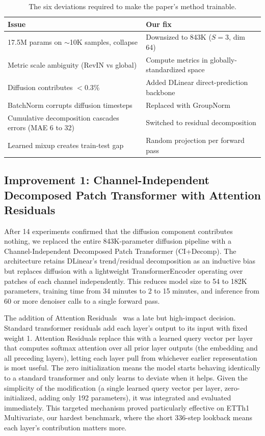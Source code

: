 \documentclass[conference]{IEEEtran}
\begin{document}
\begin{table}[t]
\caption{The six deviations required to make the paper's method trainable.}
\label{tab:deviations}
\centering
\small
\begin{tabular}{p{}p{}}
\toprule
Issue & Our fix \\
\midrule
17.5M params on $\sim$10K samples, collapse & Downsized to 843K ($S{=}3$, dim 64) \\
Metric scale ambiguity (RevIN vs global) & Compute metrics in globally-standardized space \\
Diffusion contributes $<$0.3\% & Added DLinear direct-prediction backbone \\
BatchNorm corrupts diffusion timesteps & Replaced with GroupNorm \\
Cumulative decomposition cascades errors (MAE 6 to 32) & Switched to residual decomposition \\
Learned mixup creates train-test gap & Random projection per forward pass \\
\bottomrule
\end{tabular}
\end{table}

\subsection{Improvement 1: Channel-Independent Decomposed Patch Transformer with Attention Residuals}
After 14 experiments confirmed that the diffusion component contributes nothing, we replaced the entire 843K-parameter diffusion pipeline with a Channel-Independent Decomposed Patch Transformer (CI+Decomp). The architecture retains DLinear's trend/residual decomposition as an inductive bias but replaces diffusion with a lightweight TransformerEncoder operating over patches of each channel independently. This reduces model size to 54 to 182K parameters, training time from 34 minutes to 2 to 15 minutes, and inference from 60 or more denoiser calls to a single forward pass.

The addition of Attention Residuals~\cite{attnres} was a late but high-impact decision. Standard transformer residuals add each layer's output to its input with fixed weight 1. Attention Residuals replace this with a learned query vector per layer that computes softmax attention over all prior layer outputs (the embedding and all preceding layers), letting each layer pull from whichever earlier representation is most useful. The zero initialization means the model starts behaving identically to a standard transformer and only learns to deviate when it helps. Given the simplicity of the modification (a single learned query vector per layer, zero-initialized, adding only 192 parameters), it was integrated and evaluated immediately. This targeted mechanism proved particularly effective on ETTh1 Multivariate, our hardest benchmark, where the short 336-step lookback means each layer's contribution matters more.
\end{document}
